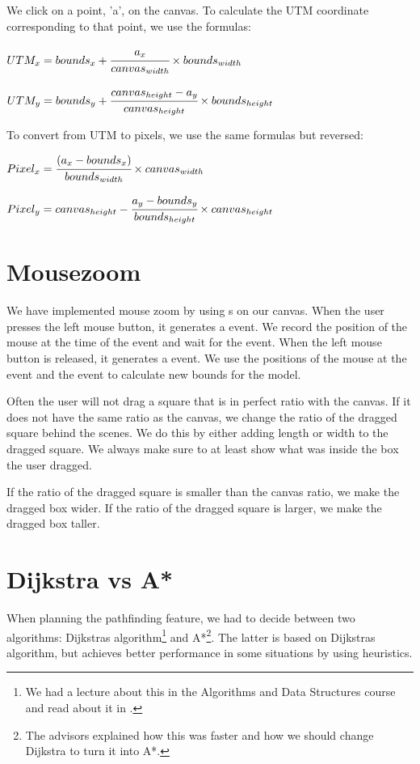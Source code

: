 We click on a point, 'a', on the canvas. To calculate the UTM coordinate
corresponding to that point, we use the formulas:

\begin{center}
$
UTM_x = bounds_x + \cfrac{a_x}{canvas_{width}} \times bounds_{width}
$
\end{center}

\begin{center}
$
UTM_y = bounds_y + \cfrac{canvas_{height} - a_y}{canvas_{height}} \times
bounds_{height}
$
\end{center}

To convert from UTM to pixels, we use the same formulas but reversed:

\begin{center} 
$
Pixel_x = \cfrac{(a_x - bounds_x)}{bounds_{width}} \times
canvas_{width}
$
\end{center}

\begin{center}
$
Pixel_y = canvas_{height} - \cfrac{a_y - bounds_y}{bounds_{height}} \times
canvas_{height}
$
\end{center}

\section{Mousezoom}
\label{IMPL-MZ}
We have implemented mouse zoom by using s on
our canvas. When the user presses the left mouse button, it generates a
 event. We record the position of the mouse at the time of
the  event and wait for the  event.
When the left mouse button is released, it generates a 
event. We use the positions of the mouse at the  event and
the  event to calculate new bounds for the model.

Often the user will not drag a square that is in perfect ratio with the
canvas. If it does not have the same ratio as the canvas, we change the ratio
of the dragged square behind the scenes. We do this by either adding length or
width to the dragged square. We always make sure to at least show what was
inside the box the user dragged.

If the ratio of the dragged square is smaller than the canvas ratio, we make the
dragged box wider. If the ratio of the dragged square is larger, we make the
dragged box taller.

\section{Dijkstra vs A*}
\label{IMPL-DVA}
When planning the pathfinding feature, we had to decide between two algorithms:
Dijkstras algorithm\footnote{We had a lecture about this in the Algorithms and
Data Structures course and read about it in \cite[p.~556]{algs4}.} and
A*\footnote{The advisors explained how this was faster and how we should
change Dijkstra to turn it into A*.}. The latter is based on Dijkstras
algorithm, but achieves better performance in some situations by using
heuristics.

